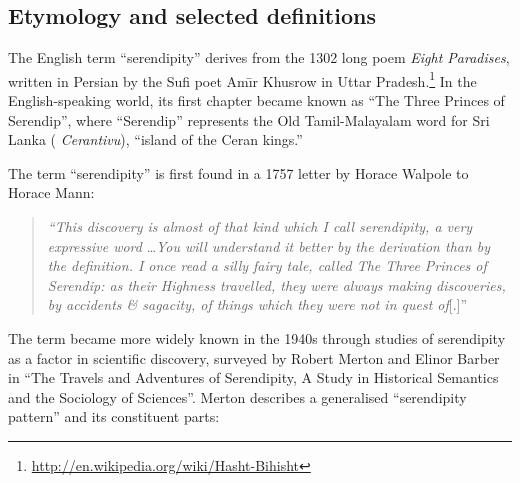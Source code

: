 
\subsection{Etymology and selected definitions} \label{sec:overview-serendipity}  \label{sec:literature-review}
The English term ``serendipity'' derives from the 1302 long poem \emph{Eight Paradises}, written in Persian by the Sufi poet Am\={\i}r Khusrow in Uttar Pradesh.\footnote{\url{http://en.wikipedia.org/wiki/Hasht-Bihisht}}  In the English-speaking world, its first chapter became known as ``The Three Princes of Serendip'', where ``Serendip'' represents the Old Tamil-Malayalam word for Sri Lanka (%
\emph{Cerantivu}), ``island of the Ceran kings.''

The term ``serendipity'' is first found in a 1757 letter by Horace Walpole to Horace Mann:
\begin{quote}
\emph{``This discovery is almost of that kind which I call serendipity, a very expressive
word} \ldots \emph{You will understand it better by the derivation than by the
definition. I once read a silly fairy tale, called The Three Princes of Serendip:
as their Highness travelled, they were always making discoveries, by accidents
\& sagacity, of things which they were not in quest of}[.]''~\cite[p. 633]{van1994anatomy}
\end{quote}
The term became more widely known in the 1940s through studies of serendipity as a factor in scientific discovery, surveyed by Robert Merton and Elinor Barber \citeyear{merton} in ``The Travels and Adventures of Serendipity, A Study in Historical Semantics and the Sociology of Sciences''.  Merton \citeyear{merton1948bearing} \cite<cited in>[pp. 195--196]{merton} describes a generalised ``serendipity pattern'' and its constituent parts:

